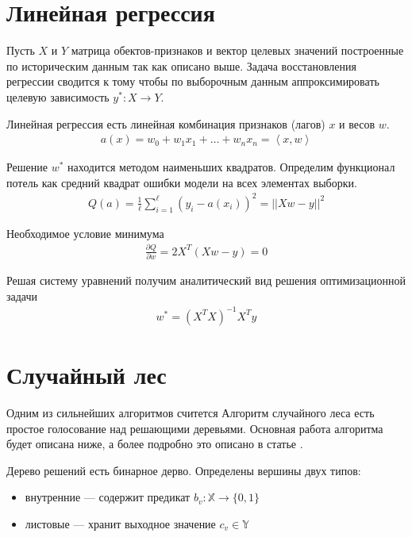 \section{Линейная регрессия}

Пусть $X$ и $Y$ матрица обектов-признаков и вектор целевых значений построенные по историческим данным так как описано выше.
Задача восстановления регрессии сводится к тому чтобы по выборочным данным аппроксимировать целевую зависимость $y^* : X \rightarrow Y$.


Линейная регрессия есть линейная комбинация признаков (лагов) $x$ и весов $w$.
\begin{align}
	a(x) = w_0 + w_1 x_1 + \dots + w_n x_n = \left< x, w \right>
\end{align}

Решение $w^*$ находится методом наименьших квадратов. 
Определим функционал потель как средний квадрат ошибки модели на всех элементах выборки.
\begin{align}
	Q(a) = \frac{1}{\ell} \sum_{i=1}^{\ell} \left( y_i - a(x_i)\right)^2 = ||Xw - y||^2
\end{align}

Необходимое условие минимума
\begin{align}
	\frac{\partial Q}{ \partial w} = 2X^T(Xw - y) = 0
\end{align}

Решая систему уравнений получим аналитический вид решения оптимизационной задачи
\begin{align}
	w^* = \left(X^TX\right)^{-1}X^Ty
\end{align}

\section{Случайный лес}

Одним из сильнейших алгоритмов считется Алгоритм случайного леса есть простое голосование над решающими деревьями.
Основная работа алгоритма будет описана ниже, а более подробно это описано в статье \cite{random_forest}.

Дерево решений есть бинарное дерво. Определены вершины двух типов: 
\begin{itemize}
	\item внутренние --- содержит предикат $b_v : \mathbb{X}\rightarrow \{0, 1\}$
	\item листовые --- хранит выходное значение $c_v \in \mathbb{Y}$
\end{itemize}

